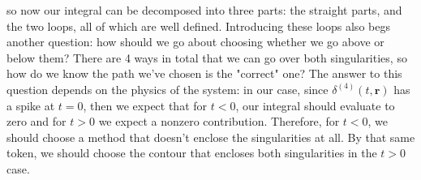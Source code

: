 so now our integral can be decomposed into three parts: the straight parts, and the two loops, all of which
are well defined. Introducing these loops also begs another question: how should we go about choosing whether
we go above or below them? There are 4 ways in total that we can go over both singularities, so how do we
know the path we've chosen is the "correct" one? The answer to this question depends on the physics of the
system: in our case, since \( \delta^{(4)}(t, \mathbf{r}) \) has a spike at \( t = 0 \), then we expect that
for \( t < 0 \), our integral should evaluate to zero and for \( t > 0 \) we expect a nonzero contribution.
Therefore, for \( t < 0 \), we should choose a method that doesn't enclose the singularities at all.
By that same token, we should choose the contour that encloses both singularities in the \( t > 0 \) case.   


 


